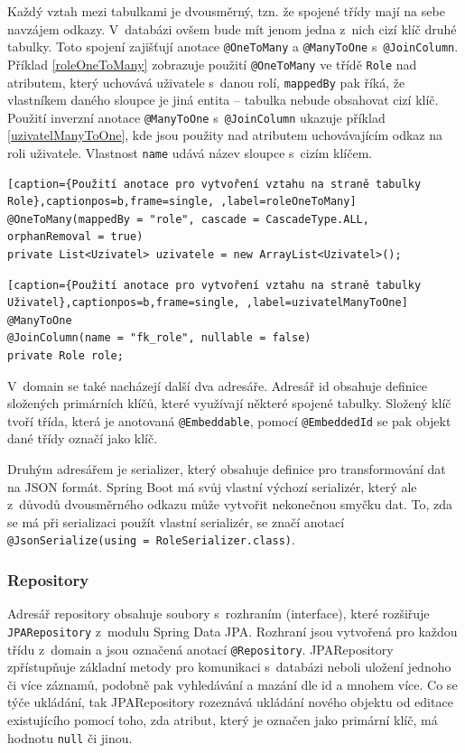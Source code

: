 Každý vztah mezi tabulkami je dvousměrný, tzn. že spojené třídy mají na sebe navzájem odkazy. V~databázi ovšem bude mít jenom jedna z~nich cizí klíč druhé tabulky. Toto spojení zajišťují anotace \texttt{@OneToMany} a \texttt{@ManyToOne} s~\texttt{@JoinColumn}. Příklad \ref{roleOneToMany} zobrazuje použití \texttt{@OneToMany} ve třídě \texttt{Role} nad atributem, který uchovává uživatele s~danou rolí, \texttt{mappedBy} pak říká, že vlastníkem daného sloupce je jiná entita – tabulka nebude obsahovat cizí klíč.
Použití inverzní anotace \texttt{@ManyToOne} s~\texttt{@JoinColumn} ukazuje příklad \ref{uzivatelManyToOne}, kde jsou použity nad atributem uchovávajícím odkaz na roli uživatele. Vlastnost \texttt{name} udává název sloupce s~cizím klíčem.

\begin{lstlisting}[caption={Použití anotace pro vytvoření vztahu na straně tabulky Role},captionpos=b,frame=single, ,label=roleOneToMany]
@OneToMany(mappedBy = "role", cascade = CascadeType.ALL, 
orphanRemoval = true)
private List<Uzivatel> uzivatele = new ArrayList<Uzivatel>();
\end{lstlisting}

\begin{lstlisting}[caption={Použití anotace pro vytvoření vztahu na straně tabulky Uživatel},captionpos=b,frame=single, ,label=uzivatelManyToOne]
@ManyToOne
@JoinColumn(name = "fk_role", nullable = false)
private Role role;
\end{lstlisting}

V~domain se také nacházejí další dva adresáře. Adresář id obsahuje definice složených primárních klíčů, které využívají některé spojené tabulky. Složený klíč tvoří třída, která je anotovaná \texttt{@Embeddable}, pomocí \texttt{@EmbeddedId} se pak objekt dané třídy označí jako klíč.

Druhým adresářem je serializer, který obsahuje definice pro transformování dat na JSON formát. Spring Boot má svůj vlastní výchozí serializér, který ale z~důvodů dvousměrného odkazu může vytvořit nekonečnou smyčku dat. To, zda se má při serializaci použít vlastní serializér, se značí anotací \texttt{@JsonSerialize(using = RoleSerializer.class)}.

\subsubsection *{Repository}

Adresář repository obsahuje soubory s~rozhraním (interface), které rozšiřuje \texttt{JPARepository} z~modulu Spring Data JPA. Rozhraní jsou vytvořená pro každou třídu z~domain a jsou označená anotací \texttt{@Repository}. JPARepository zpřístupňuje základní metody pro komunikaci s~databázi neboli uložení jednoho či více záznamů, podobně pak vyhledávání a mazání dle id a mnohem více. Co se týče ukládání, tak JPARepository rozeznává ukládání nového objektu od editace existujícího pomocí toho, zda atribut, který je označen jako primární klíč, má hodnotu \texttt{null} či jinou.

